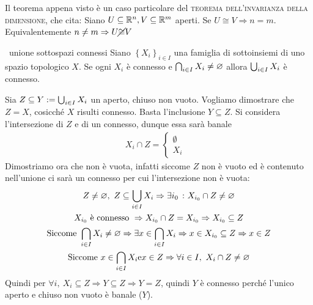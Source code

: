 \begin{observe}
	Il teorema appena visto è un caso particolare del \textsc{teorema dell'invarianza della dimensione}, che cita: \newline
	Siano $U\subseteq\mathbb{R}^n, V\subseteq\mathbb{R}^m$ aperti. Se $U\cong V \Rightarrow n=m$. Equivalentemente $n\neq m\Rightarrow U\cancel\cong V$
\end{observe}

\begin{theorema}~{unione sottospazi connessi}
	Siano $\left\{ X_i \right\}_{i\in I}$ una famiglia di sottoinsiemi di uno spazio topologico $X$. Se ogni $X_i$ è connesso e $\mathop{{\bigcap}}\displaylimits_{i\in I}X_i\neq\varnothing$ allora $\mathop{{\bigcup}}\displaylimits_{i\in I}X_i$ è connesso.	
\end{theorema}
\begin{demonstration}
	Sia $Z\subseteq Y:= \mathop{{\bigcup}}\displaylimits_{i\in I}X_i$ un aperto, chiuso non vuoto. Vogliamo dimostrare che $Z=X$, cosicché $X$ risulti connesso. Basta l'inclusione $Y\subseteq Z$.\newline
	Si considera l'intersezione di $Z$ e di un connesso, dunque essa sarà banale
	\begin{gather*}
		X_i \cap Z = \begin{cases}
			\emptyset & \\
			X_i	&		
		\end{cases}
	\end{gather*}
	Dimostriamo ora che non è vuota, infatti siccome $Z$ non è vuoto ed è contenuto nell'unione ci sarà un connesso per cui l'intersezione non è vuota:
		\begin{gather*}
			Z\neq\varnothing, \ Z\subseteq \mathop{{\bigcup}}\displaylimits_{i\in I}X_i \Rightarrow \exists i_0 \ \colon X_{i_0}\cap Z\neq \varnothing	\\
			X_{i_0} \text{ è connesso } \Rightarrow X_{i_0}\cap Z=X_{i_0} \Rightarrow X_{i_0}\subseteq Z \\
			\text{Siccome } \mathop{{\bigcap}}\displaylimits_{i\in I}X_i\neq\varnothing \Rightarrow \exists x\in\mathop{{\bigcap}}\displaylimits_{i\in I}X_i \Rightarrow x\in X_{i_0}\subseteq Z \Rightarrow x\in Z	\\
			\text{Siccome } x\in\mathop{{\bigcap}}\displaylimits_{i\in I}X_i \text{e} x\in Z \Rightarrow \forall i\in I, \ X_i\cap Z\neq\varnothing
		\end{gather*}
	Quindi per $\forall i, \ X_i\subseteq Z \Rightarrow Y\subseteq Z \Rightarrow Y=Z$, quindi $Y$ è connesso perché l'unico aperto e chiuso non vuoto è banale ($Y$).
\end{demonstration}


